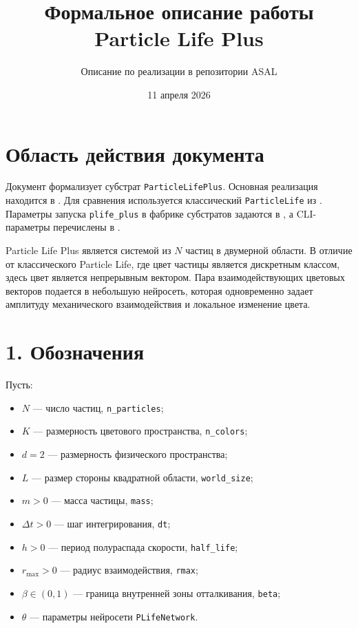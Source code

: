\documentclass[11pt,a4paper]{article}
\title{\textbf{Формальное описание работы Particle Life Plus}}
\author{Описание по реализации в репозитории ASAL}
\date{11 апреля 2026}
\begin{document}
\maketitle

\section*{Область действия документа}

Документ формализует субстрат \texttt{ParticleLifePlus}.
Основная реализация находится в .
Для сравнения используется классический \texttt{ParticleLife} из
. Параметры запуска \texttt{plife\_plus} в фабрике
субстратов задаются в , а CLI-параметры перечислены
в .

Particle Life Plus является системой из $N$ частиц в двумерной области. В отличие
от классического Particle Life, где цвет частицы является дискретным классом,
здесь цвет является непрерывным вектором. Пара взаимодействующих цветовых
векторов подается в небольшую нейросеть, которая одновременно задает амплитуду
механического взаимодействия и локальное изменение цвета.

\section*{1. Обозначения}

Пусть:
\begin{itemize}
  \item $N$ --- число частиц, \texttt{n\_particles};
  \item $K$ --- размерность цветового пространства, \texttt{n\_colors};
  \item $d=2$ --- размерность физического пространства;
  \item $L$ --- размер стороны квадратной области, \texttt{world\_size};
  \item $m>0$ --- масса частицы, \texttt{mass};
  \item $\Delta t>0$ --- шаг интегрирования, \texttt{dt};
  \item $h>0$ --- период полураспада скорости, \texttt{half\_life};
  \item $r_{\max}>0$ --- радиус взаимодействия, \texttt{rmax};
  \item $\beta\in(0,1)$ --- граница внутренней зоны отталкивания, \texttt{beta};
  \item $\theta$ --- параметры нейросети \texttt{PLifeNetwork}.
\end{itemize}
\end{document}
